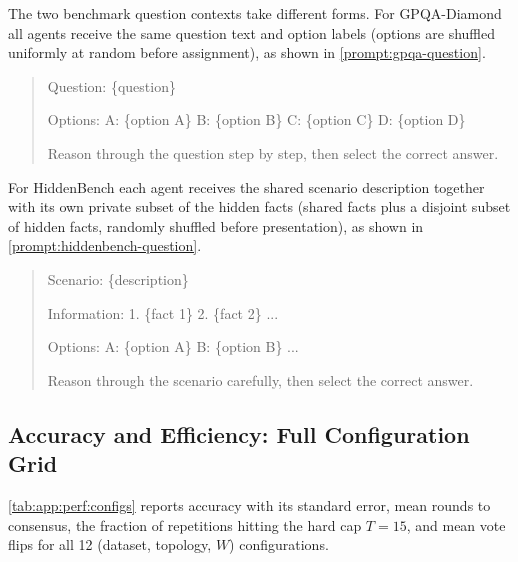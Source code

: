 The two benchmark question contexts take different forms. For GPQA-Diamond all
agents receive the same question text and option labels (options are shuffled
uniformly at random before assignment), as shown in \autoref{prompt:gpqa-question}.

\begin{prompt}[H]
\begin{quote}\small\ttfamily
Question:
\{question\}

Options:
A: \{option A\}
B: \{option B\}
C: \{option C\}
D: \{option D\}

Reason through the question step by step, then select the correct answer.
\end{quote}
\caption[GPQA question context]{GPQA-Diamond question context, identical across all
agents in a repetition. Options are shuffled uniformly before label assignment to
decorrelate answer-letter position from correctness.}
\label{prompt:gpqa-question}
\end{prompt}

For HiddenBench each agent receives the shared scenario description together with
its own private subset of the hidden facts (shared facts plus a disjoint subset of
hidden facts, randomly shuffled before presentation), as shown in \autoref{prompt:hiddenbench-question}.

\begin{prompt}[H]
\begin{quote}\small\ttfamily
Scenario:
\{description\}

Information:
1. \{fact 1\}
2. \{fact 2\}
...

Options:
A: \{option A\}
B: \{option B\}
...

Reason through the scenario carefully, then select the correct answer.
\end{quote}
\caption[HiddenBench question context]{HiddenBench question context. Agents share
the scenario description and shared facts but each receive a disjoint subset of
the hidden facts, implementing the hidden-profile paradigm. Facts are randomly
shuffled before numbering, and options are shuffled before label assignment.}
\label{prompt:hiddenbench-question}
\end{prompt}

\subsection{Accuracy and Efficiency: Full Configuration Grid}
\label{app:perf:configs}

\autoref{tab:app:perf:configs} reports accuracy with its standard error, mean
rounds to consensus, the fraction of repetitions hitting the hard cap $T = 15$,
and mean vote flips for all 12 (dataset, topology, $W$) configurations.

